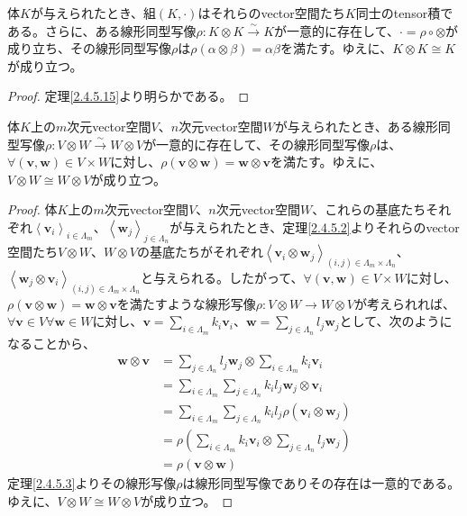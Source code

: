\documentclass[dvipdfmx]{jsarticle}
\begin{document}
\begin{thm}\label{2.4.5.16}
体$K$が与えられたとき、組$(K, \cdot )$はそれらのvector空間たち$K$同士のtensor積である。さらに、ある線形同型写像$\rho:K \otimes K\overset{\sim}{\rightarrow}K$が一意的に存在して、$\cdot = \rho \circ \otimes$が成り立ち、その線形同型写像$\rho$は$\rho(\alpha \otimes \beta) = \alpha\beta$を満たす。ゆえに、$K \otimes K \cong K$が成り立つ。
\end{thm}
\begin{proof} 定理\ref{2.4.5.15}より明らかである。
\end{proof}
\begin{thm}\label{2.4.5.17}
体$K$上の$m$次元vector空間$V$、$n$次元vector空間$W$が与えられたとき、ある線形同型写像$\rho:V \otimes W\overset{\sim}{\rightarrow}W \otimes V$が一意的に存在して、その線形同型写像$\rho$は、$\forall\left( \mathbf{v},\mathbf{w} \right) \in V \times W$に対し、$\rho\left( \mathbf{v} \otimes \mathbf{w} \right) = \mathbf{w} \otimes \mathbf{v}$を満たす。ゆえに、$V \otimes W \cong W \otimes V$が成り立つ。
\end{thm}
\begin{proof}
体$K$上の$m$次元vector空間$V$、$n$次元vector空間$W$、これらの基底たちそれぞれ$\left\langle \mathbf{v}_{i} \right\rangle_{i \in \varLambda_{m}}$、$\left\langle \mathbf{w}_{j} \right\rangle_{j \in \varLambda_{n}}$が与えられたとき、定理\ref{2.4.5.2}よりそれらのvector空間たち$V \otimes W$、$W \otimes V$の基底たちがそれぞれ$\left\langle \mathbf{v}_{i} \otimes \mathbf{w}_{j} \right\rangle_{(i,j) \in \varLambda_{m} \times \varLambda_{n}}$、$\left\langle \mathbf{w}_{j} \otimes \mathbf{v}_{i} \right\rangle_{(i,j) \in \varLambda_{m} \times \varLambda_{n}}$と与えられる。したがって、$\forall\left( \mathbf{v},\mathbf{w} \right) \in V \times W$に対し、$\rho\left( \mathbf{v} \otimes \mathbf{w} \right) = \mathbf{w} \otimes \mathbf{v}$を満たすような線形写像$\rho:V \otimes W \rightarrow W \otimes V$が考えられれば、$\forall\mathbf{v} \in V\forall\mathbf{w} \in W$に対し、$\mathbf{v} = \sum_{i \in \varLambda_{m}} {k_{i}\mathbf{v}_{i}}$、$\mathbf{w} = \sum_{j \in \varLambda_{n}} {l_{j}\mathbf{w}_{j}}$として、次のようになることから、
\begin{align*}
\mathbf{w} \otimes \mathbf{v} &= \sum_{j \in \varLambda_{n}} {l_{j}\mathbf{w}_{j}} \otimes \sum_{i \in \varLambda_{m}} {k_{i}\mathbf{v}_{i}}\\
&= \sum_{i \in \varLambda_{m}} {\sum_{j \in \varLambda_{n}} {k_{i}l_{j}\mathbf{w}_{j} \otimes \mathbf{v}_{i}}}\\
&= \sum_{i \in \varLambda_{m}} {\sum_{j \in \varLambda_{n}} {k_{i}l_{j}\rho\left( \mathbf{v}_{i} \otimes \mathbf{w}_{j} \right)}}\\
&= \rho\left( \sum_{i \in \varLambda_{m}} {k_{i}\mathbf{v}_{i}} \otimes \sum_{j \in \varLambda_{n}} {l_{j}\mathbf{w}_{j}} \right)\\
&= \rho\left( \mathbf{v} \otimes \mathbf{w} \right)
\end{align*}
定理\ref{2.4.5.3}よりその線形写像$\rho$は線形同型写像でありその存在は一意的である。ゆえに、$V \otimes W \cong W \otimes V$が成り立つ。
\end{proof}
\end{document}

